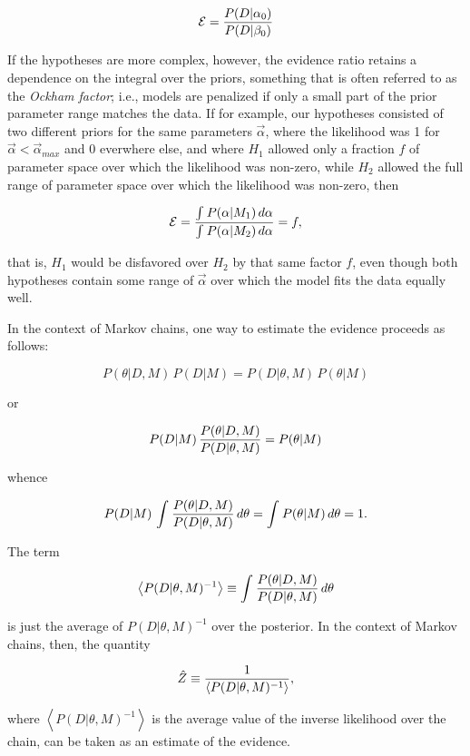 \begin{equation}
\mathcal{E} = {{P(D|\alpha_0)}\over{P(D|\beta_0)}}
\end{equation}

If the hypotheses are more complex, however, the evidence ratio
retains a dependence on the integral over the priors, something that
is often referred to as the {\it Ockham factor}; i.e., models are
penalized if only a small part of the prior parameter range matches
the data.  If for example, our hypotheses consisted of two different
priors for the same parameters $\vec{\alpha}$, where the likelihood
was 1 for $\vec{\alpha} < \vec{\alpha}_{max}$ and 0 everwhere
else, and where $H_1$ allowed only a fraction $f$ of parameter space
over which the likelihood was non-zero, while $H_2$ allowed the full
range of parameter space over which the likelihood was non-zero, then


\begin{equation}
\mathcal{E} = {{\int^{}_{}{P(\alpha|M_1)\,d\alpha}}\over{\int^{}_{}{P(\alpha|M_2)\,d\alpha}}} = f,
\end{equation}

that is, $H_1$ would be disfavored over $H_2$ by that same factor $f$,
even though both hypotheses contain some range of $\vec{\alpha}$ over
which the model fits the data equally well.

In the context of Markov chains, one way to estimate the evidence
proceeds as follows:

\begin{equation}
P(\theta|D,M)\, P(D|M) = {{P(D|\theta,M)\, P(\theta|M)}}
\end{equation}

or

\begin{equation}
P(D|M)\, {{P(\theta|D,M)}\over{P(D|\theta,M)}} = P(\theta|M)
\end{equation}

whence 

\begin{equation}
P(D|M)\, \int^{}_{}{{{P(\theta|D,M)}\over{P(D|\theta,M)}}\,d\theta} = \int^{}_{}{P(\theta|M)\,d\theta} = 1.
\end{equation}

The term 

\begin{equation}
\left<P(D|\theta,M)^{-1}\right> \equiv \int^{}_{}{{{P(\theta|D,M)}\over{P(D|\theta,M)}}\,d\theta}
\end{equation}

is just the average of $P(D|\theta,M)^{-1}$ over the posterior.
In the context of Markov chains, then, the quantity

\begin{equation}
\hat{Z} \equiv {{1}\over{\left<P(D|\theta,M)^{-1}\right>}},
\end{equation}

where $\left<P(D|\theta,M)^{-1}\right>$ is the average value of the
inverse likelihood over the chain, can be taken as an estimate of the
evidence.
